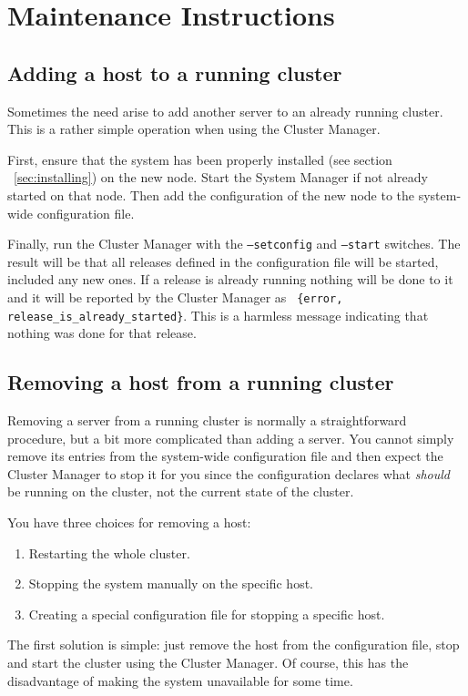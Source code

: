 \documentclass[11pt,a4paper]{report}
\begin{document}
\chapter{Maintenance Instructions}
\section{Adding a host to a running cluster}
Sometimes the need arise to add another server to an already running
cluster. This is a rather simple operation when using the Cluster Manager.

First, ensure that the system has been properly installed (see section
~\ref{sec:installing}) on the new node. Start the System Manager if not already
started on that node. Then add the configuration of the new node to the
system-wide configuration file.

Finally, run the Cluster Manager with the {\tt --setconfig} and {\tt --start}
switches. The result will be that all releases defined in the configuration file
will be started, included any new ones. If a release is already running nothing
will be done to it and it will be reported by the Cluster Manager as {\tt
  \{error, release\_is\_already\_started\}}. This is a harmless message
indicating that nothing was done for that release.
\section{Removing a host from a running cluster}
Removing a server from a running cluster is normally a straightforward
procedure, but a bit more complicated than adding a server. You cannot simply
remove its entries from the system-wide configuration file and then expect the
Cluster Manager to stop it for you since the configuration declares what
\emph{should} be running on the cluster, not the current state of the cluster.

You have three choices for removing a host:
\begin{enumerate}
  \item Restarting the whole cluster.
  \item Stopping the system manually on the specific host.
  \item Creating a special configuration file for stopping a specific host.
\end{enumerate}

The first solution is simple: just remove the host from the configuration file,
stop and start the cluster using the Cluster Manager. Of course, this has the
disadvantage of making the system unavailable for some time.
\end{document}
